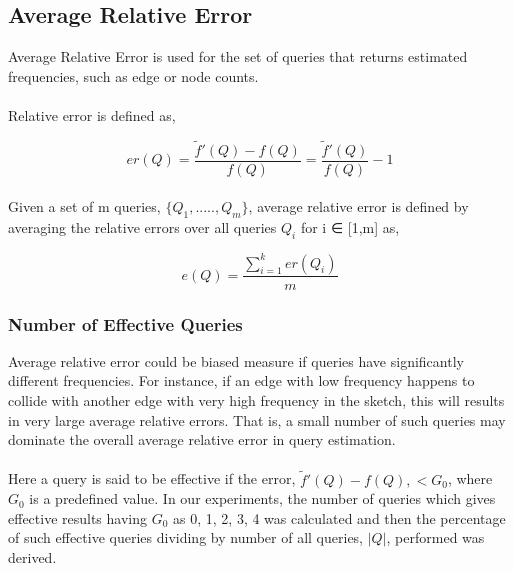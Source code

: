 \documentclass[12pt]{report}
\numberwithin{figure}{section}
\numberwithin{table}{section}
\begin{document}
\subsection{Average Relative Error}
Average Relative Error is used for the set of queries that returns estimated frequencies, such as edge or node counts.

\paragraph{}

Relative error is defined as, 

\begin{equation}
er(Q) =  \frac{\tilde{f}'(Q) - f(Q)}{f(Q)} = \frac{\tilde{f}'(Q)}{f(Q)} -1 
\end{equation}

\paragraph{}

Given a set of m queries, $\{ Q_1 , ....., Q_m \}$, average relative error is defined by averaging the relative errors over all queries $Q_i$ for i ∈ [1,m] as,

\begin{equation}
e(Q) =  \frac{\sum_{i=1}^{k} er(Q_i)}{m}
\end{equation}

\subsubsection{Number of Effective Queries}
Average relative error could be biased measure if queries have significantly different frequencies. For instance, if an edge with low frequency happens to collide with another edge with very high frequency in the sketch, this will results in very large average relative errors. That is, a small number of such queries may dominate the overall average relative error in query estimation.

\paragraph{}

Here a query is said to be effective if the error, $\tilde{f}'(Q) - f(Q), < G_0$,  where $G_0$ is a predefined value. In our experiments, the number of queries which gives effective results having $G_0$ as 0, 1, 2, 3, 4 was calculated and then the percentage of such effective queries dividing by number of all queries, $|Q|$, performed was derived. 
\end{document}
